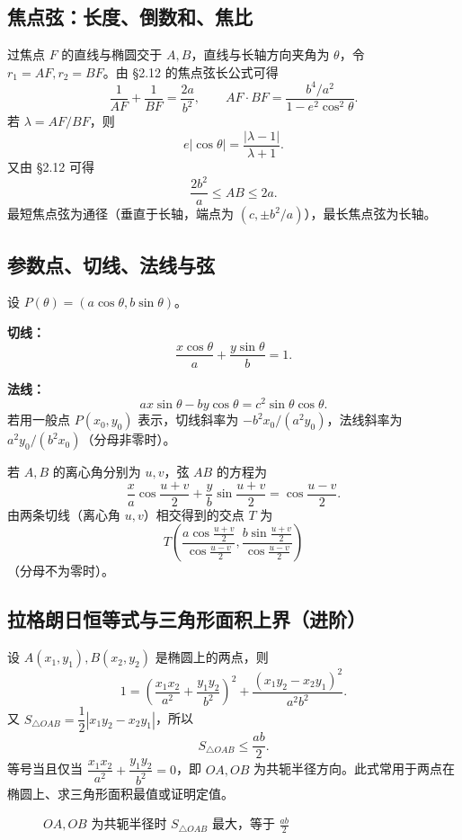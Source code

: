 \documentclass[UTF8,zihao=-4,a4paper]{ctexart}
\newcommand{\abs}[1]{\left|#1\right|}
\begin{document}
\subsection{焦点弦：长度、倒数和、焦比}

过焦点 $F$ 的直线与椭圆交于 $A,B$，直线与长轴方向夹角为 $\theta$，令 $r_1=AF,r_2=BF$。由 §2.12 的焦点弦长公式可得
\[
\boxed{\frac1{AF}+\frac1{BF}=\frac{2a}{b^2}},
\qquad
\boxed{AF\cdot BF=\frac{b^4/a^2}{1-e^2\cos^2\theta}}.
\]
若 $\lambda=AF/BF$，则
\[
\boxed{e\abs{\cos\theta}=\frac{\abs{\lambda-1}}{\lambda+1}}.
\]
又由 §2.12 可得
\[
\boxed{\frac{2b^2}{a}\le AB\le 2a}.
\]
最短焦点弦为通径（垂直于长轴，端点为 $(c,\pm b^2/a)$），最长焦点弦为长轴。

\subsection{参数点、切线、法线与弦}

设 $P(\theta)=(a\cos\theta,b\sin\theta)$。

\textbf{切线：}
\[
\boxed{\frac{x\cos\theta}{a}+\frac{y\sin\theta}{b}=1}.
\]

\textbf{法线：}
\[
\boxed{a x\sin\theta-b y\cos\theta=c^2\sin\theta\cos\theta}.
\]
若用一般点 $P(x_0,y_0)$ 表示，切线斜率为 $-b^2x_0/(a^2y_0)$，法线斜率为 $a^2y_0/(b^2x_0)$（分母非零时）。

若 $A,B$ 的离心角分别为 $u,v$，弦 $AB$ 的方程为
\[
\boxed{
\frac{x}{a}\cos\frac{u+v}{2}
+\frac{y}{b}\sin\frac{u+v}{2}
=\cos\frac{u-v}{2}.}
\]
由两条切线（离心角 $u,v$）相交得到的交点 $T$ 为
\[
\boxed{
T\left(
\frac{a\cos\frac{u+v}{2}}{\cos\frac{u-v}{2}},
\frac{b\sin\frac{u+v}{2}}{\cos\frac{u-v}{2}}
\right)}
\]
（分母不为零时）。

\subsection{拉格朗日恒等式与三角形面积上界（进阶）}
设 $A(x_1,y_1),B(x_2,y_2)$ 是椭圆上的两点，则
\[
\boxed{1=\left(\frac{x_1x_2}{a^2}+\frac{y_1y_2}{b^2}\right)^2
+\frac{(x_1y_2-x_2y_1)^2}{a^2b^2}}.
\]
又 $S_{\triangle OAB}=\dfrac12\abs{x_1y_2-x_2y_1}$，所以
\[
\boxed{S_{\triangle OAB}\le\frac{ab}{2}}.
\]
等号当且仅当 $\dfrac{x_1x_2}{a^2}+\dfrac{y_1y_2}{b^2}=0$，即 $OA,OB$ 为共轭半径方向。此式常用于两点在椭圆上、求三角形面积最值或证明定值。

\begin{figure}[H]
\centering
{}
\caption{$OA,OB$ 为共轭半径时 $S_{\triangle OAB}$ 最大，等于 $\frac{ab}{2}$}
\end{figure}
\end{document}
